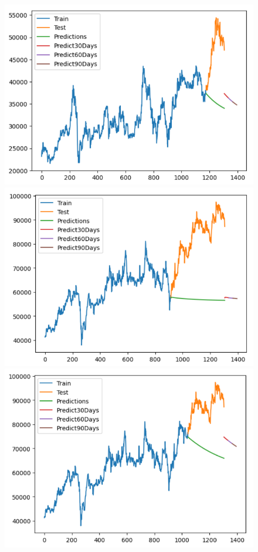 \begin{figure}[H]
\begin{minipage}{0.15\textwidth}
    \centering
    \includegraphics[width=1\textwidth]{resources/chapter-5/newdata1/result/BIDV_VARMA_9-1.png}
    \end{minipage}
    \hfill
    \begin{minipage}{0.15\textwidth}
    \centering
    \includegraphics[width=1\textwidth]{resources/chapter-5/newdata1/result/VCB_VARMA_7-3.png}
    \end{minipage}
    \hfill
    \begin{minipage}{0.15\textwidth}
    \centering
    \includegraphics[width=1\textwidth]{resources/chapter-5/newdata1/result/VCB_VARMA_8-2.png}

\end{minipage}
\end{figure}
